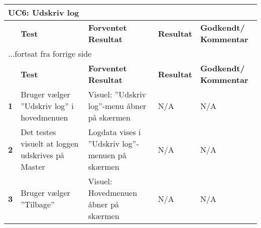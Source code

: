 
\begin{center}
\begin{longtable}{|p{}|p{}|p{}|p{}|p{}|} %
\hline
\multicolumn{5}{|l|}{\textbf{UC6: Udskriv log}} \\ \hline
\multicolumn{1}{|c|}{} &
\textbf{Test} &
\textbf{Forventet \newline Resultat} &
\textbf{Resultat} &
\textbf{Godkendt/ \newline Kommentar} \\ \hline 
\endfirsthead

\multicolumn{5}{l}{...fortsat fra forrige side} \\ \hline 
\multicolumn{1}{|c|}{} &
\textbf{Test} &
\textbf{Forventet \newline Resultat} &
\textbf{Resultat} &
\textbf{Godkendt/ \newline Kommentar} \\ \hline 
\endhead

\textbf{1}	&Bruger vælger ''Udskriv log'' i hovedmenuen
			&Visuel: ''Udskriv log''-menu åbner på skærmen
			&N/A
			&N/A \\ \hline 
			
\textbf{2}	&Det testes visuelt at loggen udskrives på Master
			&Logdata vises i ''Udskriv log''-menuen på skærmen
			&N/A
			&N/A \\ \hline 
			
\textbf{3}	&Bruger vælger ''Tilbage''
			&Visuel: Hovedmenuen åbner på skærmen
			&N/A
			&N/A \\ \hline 
			
\end{longtable}
	\label{ATUC8} 
\end{center}
